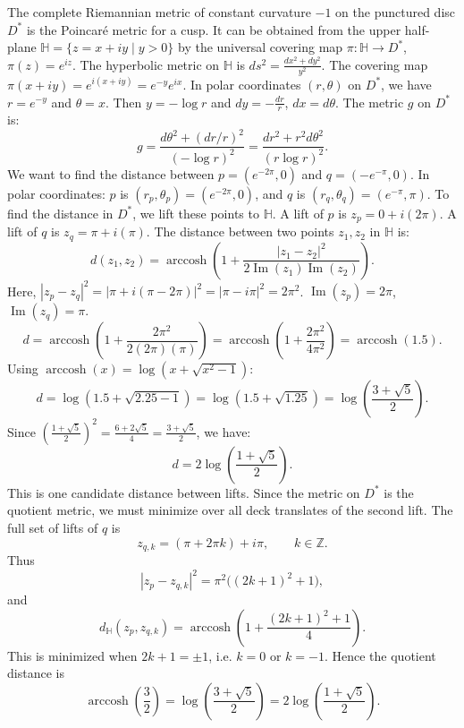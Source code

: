 \begin{solution}
The complete Riemannian metric of constant curvature $-1$ on the punctured disc $D^*$ is the Poincaré metric for a cusp. It can be obtained from the upper half-plane $\mathbb{H} = \{ z = x + iy \mid y > 0 \}$ by the universal covering map $\pi: \mathbb{H} \to D^*$, $\pi(z) = e^{iz}$.
The hyperbolic metric on $\mathbb{H}$ is $ds^2 = \frac{dx^2 + dy^2}{y^2}$.
The covering map $\pi(x + iy) = e^{i(x + iy)} = e^{-y} e^{ix}$.
In polar coordinates $(r, \theta)$ on $D^*$, we have $r = e^{-y}$ and $\theta = x$.
Then $y = -\log r$ and $dy = -\frac{dr}{r}$, $dx = d\theta$.
The metric $g$ on $D^*$ is:
\[ g = \frac{d\theta^2 + (dr/r)^2}{(-\log r)^2} = \frac{dr^2 + r^2 d\theta^2}{(r \log r)^2}. \]
We want to find the distance between $p = (e^{-2\pi}, 0)$ and $q = (-e^{-\pi}, 0)$.
In polar coordinates: $p$ is $(r_p, \theta_p) = (e^{-2\pi}, 0)$, and $q$ is $(r_q, \theta_q) = (e^{-\pi}, \pi)$.
To find the distance in $D^*$, we lift these points to $\mathbb{H}$.
A lift of $p$ is $z_p = 0 + i(2\pi)$.
A lift of $q$ is $z_q = \pi + i(\pi)$.
The distance between two points $z_1, z_2$ in $\mathbb{H}$ is:
\[ d(z_1, z_2) = \operatorname{arccosh}\left( 1 + \frac{|z_1 - z_2|^2}{2 \operatorname{Im}(z_1) \operatorname{Im}(z_2)} \right). \]
Here, $|z_p - z_q|^2 = |\pi + i(\pi - 2\pi)|^2 = |\pi - i\pi|^2 = 2\pi^2$.
$\operatorname{Im}(z_p) = 2\pi$, $\operatorname{Im}(z_q) = \pi$.
\[ d = \operatorname{arccosh}\left( 1 + \frac{2\pi^2}{2(2\pi)(\pi)} \right) = \operatorname{arccosh}\left( 1 + \frac{2\pi^2}{4\pi^2} \right) = \operatorname{arccosh}(1.5). \]
Using $\operatorname{arccosh}(x) = \log(x + \sqrt{x^2 - 1})$:
\[ d = \log(1.5 + \sqrt{2.25 - 1}) = \log(1.5 + \sqrt{1.25}) = \log\left(\frac{3 + \sqrt{5}}{2}\right). \]
Since $\left(\frac{1+\sqrt{5}}{2}\right)^2 = \frac{6+2\sqrt{5}}{4} = \frac{3+\sqrt{5}}{2}$, we have:
\[ d = 2 \log\left(\frac{1+\sqrt{5}}{2}\right). \]
This is one candidate distance between lifts. Since the metric on $D^*$ is the quotient metric, we must minimize over all deck translates of the second lift. The full set of lifts of $q$ is
\[
z_{q,k}=(\pi+2\pi k)+i\pi,\qquad k\in\mathbb{Z}.
\]
Thus
\[
|z_p-z_{q,k}|^2
=\pi^2\bigl((2k+1)^2+1\bigr),
\]
and
\[
d_{\mathbb H}(z_p,z_{q,k})
=\operatorname{arccosh}\left(
1+\frac{(2k+1)^2+1}{4}
\right).
\]
This is minimized when $2k+1=\pm1$, i.e. $k=0$ or $k=-1$. Hence the quotient distance is
\[
\operatorname{arccosh}\left(\frac{3}{2}\right)
=\log\left(\frac{3+\sqrt5}{2}\right)
=2\log\left(\frac{1+\sqrt5}{2}\right).
\]
\end{solution}

